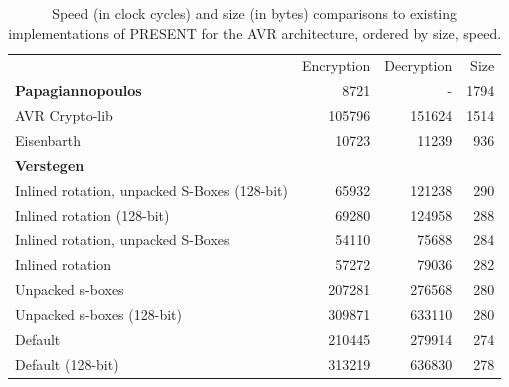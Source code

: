 \documentclass[11pt]{llncs2e} %
\begin{document}

\begin{table}[h]
\centering
\footnotesize
	\begin{tabular}{ l r r r }
		& Encryption & Decryption & Size \\
	\textbf{Papagiannopoulos}~\cite{kostas_code} & 8721 & - & 1794 \\
	AVR Crypto-lib~\cite{avr_crypto_lib} & 105796 & 151624 & 1514 \\
	Eisenbarth~\cite{eisenbarth2012compact} & 10723 & 11239 & 936 \\
	\textbf{Verstegen}~\cite{aram_code} & & & \\
	\hspace{0.4em} Inlined rotation, unpacked S-Boxes (128-bit) & 65932 & 121238 & 290 \\
	\hspace{0.4em} Inlined rotation (128-bit) & 69280	& 124958 & 288 \\
	\hspace{0.4em} Inlined rotation, unpacked S-Boxes & 54110 & 75688 & 284 \\
	\hspace{0.4em} Inlined rotation & 57272 & 79036 & 282 \\
	\hspace{0.4em} Unpacked s-boxes & 207281 & 276568 & 280 \\
	\hspace{0.4em} Unpacked s-boxes (128-bit) & 309871 & 633110 & 280 \\
	\hspace{0.4em} Default & 210445 & 279914 & 274 \\
	\hspace{0.4em} Default (128-bit) & 313219 & 636830 & 278 \\
	\end{tabular}
	\caption{\footnotesize Speed (in clock cycles) and size (in bytes) comparisons to existing implementations of PRESENT for the AVR architecture, ordered by size, speed.}
	\label{numbers}
\end{table}

{}

\end{document}
